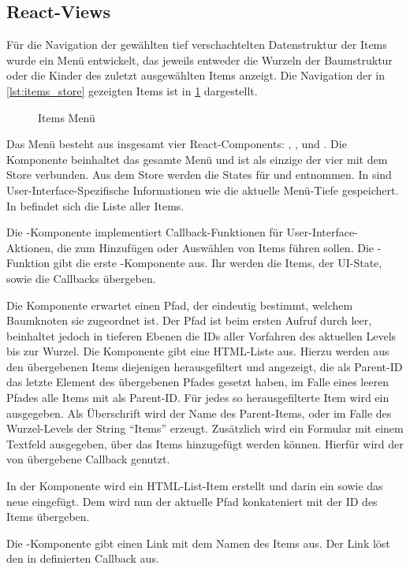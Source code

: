 \subsection{React-Views}
\label{ssec:fi_react_views}

Für die Navigation der gewählten tief verschachtelten Datenstruktur der Items
wurde ein Menü entwickelt, das jeweils entweder die Wurzeln der Baumstruktur
oder die Kinder des zuletzt ausgewählten Items anzeigt.  Die Navigation der in
\cref{lst:items_store} gezeigten Items ist in \cref{fig:items_menu} dargestellt.

\begin{figure}
	\centering
	
	\caption{Items Menü}
	\label{fig:items_menu}
\end{figure}

Das Menü besteht aus insgesamt vier React-Components: ,
,  und .  Die Komponente
 beinhaltet das gesamte Menü und ist als einzige der vier mit dem
Store verbunden.  Aus dem Store werden die States für
 und  entnommen.  In  sind
User-Interface-Spezifische Informationen wie die aktuelle Menü-Tiefe
gespeichert.  In  befindet sich die Liste aller
Items.

Die -Komponente implementiert Callback-Funktionen für
User-Interface-Aktionen, die zum Hinzufügen oder Auswählen von Items führen
sollen.  Die -Funktion gibt die erste -Komponente
aus.  Ihr werden die Items, der UI-State, sowie die Callbacks übergeben.

Die Komponente  erwartet einen Pfad, der eindeutig bestimmt,
welchem Baumknoten sie zugeordnet ist.  Der Pfad ist beim ersten Aufruf durch
 leer, beinhaltet jedoch in tieferen Ebenen die IDs aller Vorfahren
des aktuellen Levels bis zur Wurzel.  Die Komponente gibt eine HTML-Liste aus.
Hierzu werden aus den übergebenen Items diejenigen herausgefiltert und
angezeigt, die als Parent-ID das letzte Element des übergebenen Pfades gesetzt
haben, im Falle eines leeren Pfades alle Items mit  als Parent-ID.
Für jedes so herausgefilterte Item wird ein  ausgegeben.
Als Überschrift wird der Name des Parent-Items, oder im Falle des Wurzel-Levels
der String \enquote{Items} erzeugt.  Zusätzlich wird ein Formular mit einem
Textfeld ausgegeben, über das Items hinzugefügt werden können.  Hierfür wird
der von  übergebene Callback genutzt.

In der Komponente  wird ein HTML-List-Item erstellt und
darin ein  sowie das neue  eingefügt.  Dem
 wird nun der aktuelle Pfad konkateniert mit der ID des Items
übergeben.

Die -Komponente gibt einen Link mit dem Namen des Items aus.  Der
Link löst den in  definierten Callback aus.
